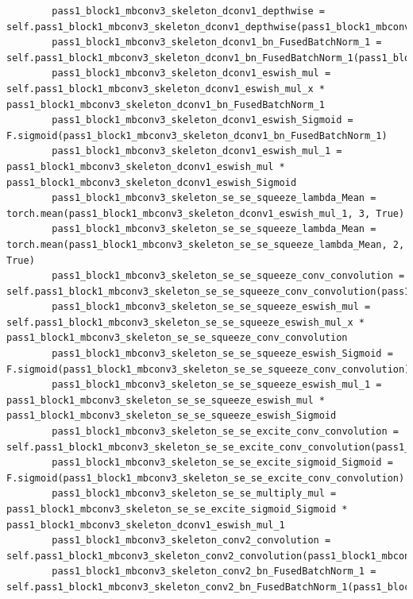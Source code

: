 \documentclass{fisatprojectfinal}
\begin{document}
\begin{appendices}
\begin{lstlisting}
        pass1_block1_mbconv3_skeleton_dconv1_depthwise = self.pass1_block1_mbconv3_skeleton_dconv1_depthwise(pass1_block1_mbconv3_skeleton_dconv1_depthwise_pad)
        pass1_block1_mbconv3_skeleton_dconv1_bn_FusedBatchNorm_1 = self.pass1_block1_mbconv3_skeleton_dconv1_bn_FusedBatchNorm_1(pass1_block1_mbconv3_skeleton_dconv1_depthwise)
        pass1_block1_mbconv3_skeleton_dconv1_eswish_mul = self.pass1_block1_mbconv3_skeleton_dconv1_eswish_mul_x * pass1_block1_mbconv3_skeleton_dconv1_bn_FusedBatchNorm_1
        pass1_block1_mbconv3_skeleton_dconv1_eswish_Sigmoid = F.sigmoid(pass1_block1_mbconv3_skeleton_dconv1_bn_FusedBatchNorm_1)
        pass1_block1_mbconv3_skeleton_dconv1_eswish_mul_1 = pass1_block1_mbconv3_skeleton_dconv1_eswish_mul * pass1_block1_mbconv3_skeleton_dconv1_eswish_Sigmoid
        pass1_block1_mbconv3_skeleton_se_se_squeeze_lambda_Mean = torch.mean(pass1_block1_mbconv3_skeleton_dconv1_eswish_mul_1, 3, True)
        pass1_block1_mbconv3_skeleton_se_se_squeeze_lambda_Mean = torch.mean(pass1_block1_mbconv3_skeleton_se_se_squeeze_lambda_Mean, 2, True)
        pass1_block1_mbconv3_skeleton_se_se_squeeze_conv_convolution = self.pass1_block1_mbconv3_skeleton_se_se_squeeze_conv_convolution(pass1_block1_mbconv3_skeleton_se_se_squeeze_lambda_Mean)
        pass1_block1_mbconv3_skeleton_se_se_squeeze_eswish_mul = self.pass1_block1_mbconv3_skeleton_se_se_squeeze_eswish_mul_x * pass1_block1_mbconv3_skeleton_se_se_squeeze_conv_convolution
        pass1_block1_mbconv3_skeleton_se_se_squeeze_eswish_Sigmoid = F.sigmoid(pass1_block1_mbconv3_skeleton_se_se_squeeze_conv_convolution)
        pass1_block1_mbconv3_skeleton_se_se_squeeze_eswish_mul_1 = pass1_block1_mbconv3_skeleton_se_se_squeeze_eswish_mul * pass1_block1_mbconv3_skeleton_se_se_squeeze_eswish_Sigmoid
        pass1_block1_mbconv3_skeleton_se_se_excite_conv_convolution = self.pass1_block1_mbconv3_skeleton_se_se_excite_conv_convolution(pass1_block1_mbconv3_skeleton_se_se_squeeze_eswish_mul_1)
        pass1_block1_mbconv3_skeleton_se_se_excite_sigmoid_Sigmoid = F.sigmoid(pass1_block1_mbconv3_skeleton_se_se_excite_conv_convolution)
        pass1_block1_mbconv3_skeleton_se_se_multiply_mul = pass1_block1_mbconv3_skeleton_se_se_excite_sigmoid_Sigmoid * pass1_block1_mbconv3_skeleton_dconv1_eswish_mul_1
        pass1_block1_mbconv3_skeleton_conv2_convolution = self.pass1_block1_mbconv3_skeleton_conv2_convolution(pass1_block1_mbconv3_skeleton_se_se_multiply_mul)
        pass1_block1_mbconv3_skeleton_conv2_bn_FusedBatchNorm_1 = self.pass1_block1_mbconv3_skeleton_conv2_bn_FusedBatchNorm_1(pass1_block1_mbconv3_skeleton_conv2_convolution)

\end{lstlisting}
\end{appendices}
\end{document}

